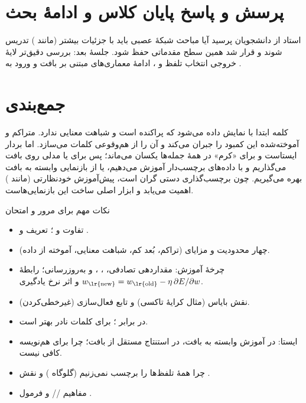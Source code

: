 \section{پرسش و پاسخ پایان کلاس و ادامهٔ بحث}
\label{sec:qa}

استاد از دانشجویان پرسید آیا مباحث شبکهٔ عصبی باید با جزئیات بیشتر (مانند ) تدریس شوند و قرار شد همین سطح مقدماتی حفظ شود. جلسهٔ بعد: بررسی دقیق‌تر لایهٔ خروجی انتخاب تلفظ و ، ادامهٔ معماری‌های مبتنی بر بافت و ورود به .

\section{جمع‌بندی}

کلمه ابتدا با  نمایش داده می‌شود که پراکنده است و شباهت معنایی ندارد.  متراکم و آموخته‌شده این کمبود را جبران می‌کند و  آن را از هم‌وقوعی کلمات می‌سازد. اما بردار  ایستاست و برای «کرم» در همهٔ جمله‌ها یکسان می‌ماند؛ پس برای  یا مدلی روی بافت می‌گذاریم و با داده‌های برچسب‌دار آموزش می‌دهیم، یا از بازنمایی وابسته به بافت بهره می‌گیریم. چون برچسب‌گذاری دستی گران است، پیش‌آموزش خودنظارتی (مانند ) اهمیت می‌یابد و  ابزار اصلی ساخت این بازنمایی‌هاست.

\begin{exambox}{نکات مهم برای مرور و امتحان}
\begin{itemize}
  \item تفاوت  و ؛ تعریف  و .
  \item چهار محدودیت  و مزایای  (تراکم، بُعد کم، شباهت معنایی، آموخته از داده).
  \item چرخهٔ آموزش: مقداردهی تصادفی، ، ،  و به‌روزرسانی؛ رابطهٔ $w_{\text{\lr{new}}}=w_{\text{\lr{old}}}-\eta\,\partial E/\partial w$ و اثر نرخ یادگیری.
  \item نقش بایاس (مثال کرایهٔ تاکسی) و تابع فعال‌سازی (غیرخطی‌کردن).
  \item {} در برابر ؛ برای کلمات نادر  بهتر است.
  \item {} ایستا: در آموزش وابسته به بافت، در استنتاج مستقل از بافت؛ چرا برای هم‌نویسه کافی نیست.
  \item چرا همهٔ تلفظ‌ها را برچسب نمی‌زنیم (گلوگاه ) و نقش .
  \item مفاهیم // و فرمول .
\end{itemize}
\end{exambox}
